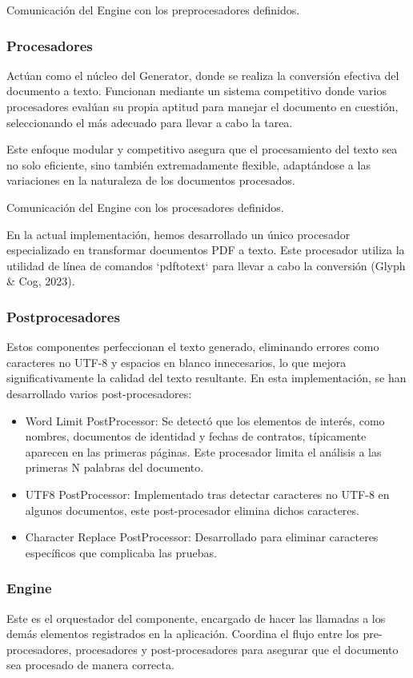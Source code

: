 Comunicación del Engine con los preprocesadores definidos.


\subsubsection*{Procesadores}
Actúan como el núcleo del Generator, donde se realiza la conversión efectiva del documento a texto. Funcionan mediante
un sistema competitivo donde varios procesadores evalúan su propia aptitud para manejar el documento en cuestión,
seleccionando el más adecuado para llevar a cabo la tarea.

Este enfoque modular y competitivo asegura que el procesamiento del texto sea no solo eficiente, sino también
extremadamente flexible, adaptándose a las variaciones en la naturaleza de los documentos procesados.


Comunicación del Engine con los procesadores definidos.

En la actual implementación, hemos desarrollado un único procesador especializado en transformar documentos PDF a
texto. Este procesador utiliza la utilidad de línea de comandos `pdftotext` para llevar a cabo la conversión (Glyph \&
Cog, 2023).

\subsubsection*{Postprocesadores}
Estos componentes perfeccionan el texto generado, eliminando errores como caracteres no UTF-8 y espacios en blanco
innecesarios, lo que mejora significativamente la calidad del texto resultante. En esta implementación, se han
desarrollado varios post-procesadores:

\begin{itemize}
    \item
    Word Limit PostProcessor: Se detectó que los elementos de interés, como nombres, documentos de identidad y fechas de
    contratos, típicamente aparecen en las primeras páginas. Este procesador limita el análisis a las primeras N
    palabras del documento.
    \item UTF8 PostProcessor: Implementado tras detectar caracteres no UTF-8 en algunos documentos, este post-procesador
    elimina dichos caracteres.
    \item Character Replace PostProcessor: Desarrollado para eliminar caracteres específicos que complicaba las pruebas.
\end{itemize}

\subsubsection*{Engine}
Este es el orquestador del componente, encargado de hacer las llamadas a los demás elementos registrados en la
aplicación. Coordina el flujo entre los pre-procesadores, procesadores y post-procesadores para asegurar que el
documento sea procesado de manera correcta.

